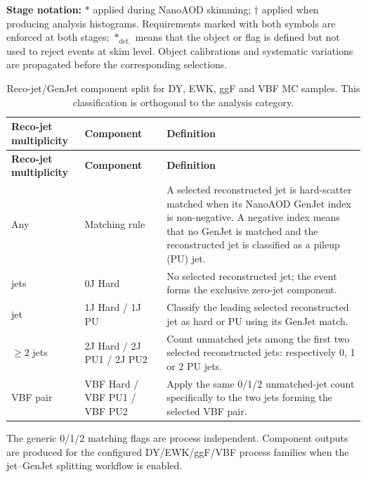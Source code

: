 \noindent\textbf{Stage notation:} $\ast$ applied during NanoAOD skimming; $\dagger$ applied when producing analysis histograms. Requirements marked with both symbols are enforced at both stages; $\ast_{\mathrm{def.}}$ means that the object or flag is defined but not used to reject events at skim level. Object calibrations and systematic variations are propagated before the corresponding selections.

\begin{longtable}{>{\raggedright\arraybackslash}p{} >{\raggedright\arraybackslash}p{} >{\raggedright\arraybackslash}p{}}
\caption{Reco-jet/GenJet component split for DY, EWK, ggF and VBF MC samples. This classification is orthogonal to the analysis category.}\label{tab:jet-gen-components} \\
\toprule
\textbf{Reco-jet multiplicity} & \textbf{Component} & \textbf{Definition} \\
\midrule
\endfirsthead
\toprule
\textbf{Reco-jet multiplicity} & \textbf{Component} & \textbf{Definition} \\
\midrule
\endhead
\bottomrule
\endlastfoot
Any & Matching rule & A selected reconstructed jet is hard-scatter matched when its NanoAOD GenJet index is non-negative. A negative index means that no GenJet is matched and the reconstructed jet is classified as a pileup (PU) jet. \\
0 jets & 0J Hard & No selected reconstructed jet; the event forms the exclusive zero-jet component. \\
1 jet & 1J Hard / 1J PU & Classify the leading selected reconstructed jet as hard or PU using its GenJet match. \\
$\geq2$ jets & 2J Hard / 2J PU1 / 2J PU2 & Count unmatched jets among the first two selected reconstructed jets: respectively 0, 1 or 2 PU jets. \\
VBF pair & VBF Hard / VBF PU1 / VBF PU2 & Apply the same 0/1/2 unmatched-jet count specifically to the two jets forming the selected VBF pair. \\
\end{longtable}

The generic 0/1/2 matching flags are process independent. Component outputs are produced for the configured DY/EWK/ggF/VBF process families when the jet--GenJet splitting workflow is enabled.
